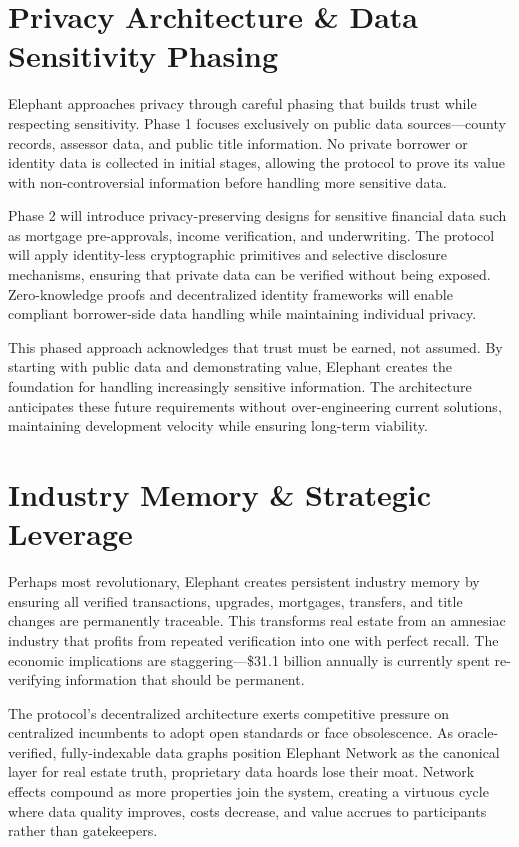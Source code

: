 \section{Privacy Architecture \& Data Sensitivity Phasing}

Elephant approaches privacy through careful phasing that builds trust while respecting sensitivity. Phase 1 focuses exclusively on public data sources—county records, assessor data, and public title information. No private borrower or identity data is collected in initial stages, allowing the protocol to prove its value with non-controversial information before handling more sensitive data.

Phase 2 will introduce privacy-preserving designs for sensitive financial data such as mortgage pre-approvals, income verification, and underwriting. The protocol will apply identity-less cryptographic primitives and selective disclosure mechanisms, ensuring that private data can be verified without being exposed. Zero-knowledge proofs and decentralized identity frameworks will enable compliant borrower-side data handling while maintaining individual privacy.

This phased approach acknowledges that trust must be earned, not assumed. By starting with public data and demonstrating value, Elephant creates the foundation for handling increasingly sensitive information. The architecture anticipates these future requirements without over-engineering current solutions, maintaining development velocity while ensuring long-term viability.

\section{Industry Memory \& Strategic Leverage}

Perhaps most revolutionary, Elephant creates persistent industry memory by ensuring all verified transactions, upgrades, mortgages, transfers, and title changes are permanently traceable. This transforms real estate from an amnesiac industry that profits from repeated verification into one with perfect recall. The economic implications are staggering—\$31.1 billion annually is currently spent re-verifying information that should be permanent.

The protocol's decentralized architecture exerts competitive pressure on centralized incumbents to adopt open standards or face obsolescence. As oracle-verified, fully-indexable data graphs position Elephant Network as the canonical layer for real estate truth, proprietary data hoards lose their moat. Network effects compound as more properties join the system, creating a virtuous cycle where data quality improves, costs decrease, and value accrues to participants rather than gatekeepers.

